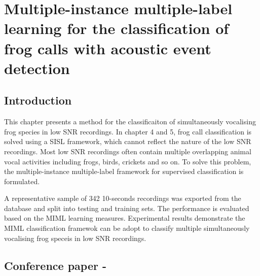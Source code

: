 
\chapter[Multiple-instance multiple-label learning for the classification of frog calls with acoustic event detection]{Multiple-instance multiple-label learning for the classification of frog calls with acoustic event detection}
\label{cha:cha6MIML}


\section{Introduction}
\label{sec:intro}

This chapter presents a method for the classificaiton of simultaneously vocalising frog species in low SNR recordings. In chapter 4 and 5, frog call classification is solved using a SISL framework, which cannot reflect the nature of the low SNR recordings. Most low SNR recordings often 
contain multiple overlapping animal vocal activities including frogs, birds, crickets and so on. To solve this problem, the multiple-instance multiple-label framework for supervised classification is formulated.

A representative sample of 342 10-seconds recordings was exported from the database and split into testing and training sets. The performance is evaluated based on the MIML learning measures. Experimental results demonstrate the MIML classification framewok can be adopt to classify multiple simultaneously vocalising frog speceis in low SNR recordings.


\section{Conference paper - }



